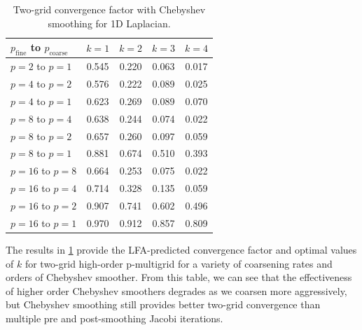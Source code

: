 \documentclass[review]{siamart190516}
\begin{document}
\begin{table}[ht!]
\begin{center}
\begin{tabular}{l c c c c}
  \toprule
  $p_{\text{fine}}$ to $p_{\text{coarse}}$  &  $k = 1$   &  $k = 2$   &  $k = 3$   &  $k = 4$   \\
  \toprule
  $p = 2$ to $p = 1$   &  0.545  &  0.220  &  0.063  &  0.017  \\
  \midrule
  $p = 4$ to $p = 2$   &  0.576  &  0.222  &  0.089  &  0.025  \\
  $p = 4$ to $p = 1$   &  0.623  &  0.269  &  0.089  &  0.070  \\
  \midrule
  $p = 8$ to $p = 4$   &  0.638  &  0.244  &  0.074  &  0.022  \\
  $p = 8$ to $p = 2$   &  0.657  &  0.260  &  0.097  &  0.059  \\
  $p = 8$ to $p = 1$   &  0.881  &  0.674  &  0.510  &  0.393  \\
  \midrule
  $p = 16$ to $p = 8$  &  0.664  &  0.253  &  0.075  &  0.022  \\
  $p = 16$ to $p = 4$  &  0.714  &  0.328  &  0.135  &  0.059  \\
  $p = 16$ to $p = 2$  &  0.907  &  0.741  &  0.602  &  0.496  \\
  $p = 16$ to $p = 1$  &  0.970  &  0.912  &  0.857  &  0.809  \\
  \bottomrule
\end{tabular}
\end{center}
\caption{Two-grid convergence factor with Chebyshev smoothing for 1D Laplacian.}
\label{table:two_grid_1d_chebyshev}
\end{table}

The results in \cref{table:two_grid_1d_chebyshev} provide the LFA-predicted convergence factor and optimal values of $k$ for two-grid high-order p-multigrid for a variety of coarsening rates and orders of Chebyshev smoother.
From this table, we can see that the effectiveness of higher order Chebyshev smoothers degrades as we coarsen more aggressively, but Chebyshev smoothing still provides better two-grid convergence than multiple pre and post-smoothing Jacobi iterations.
\end{document}
